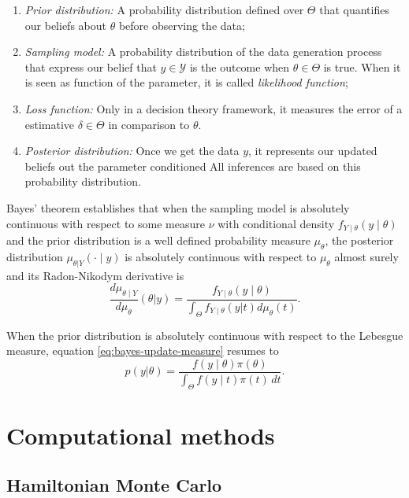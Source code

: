 \begin{enumerate}[label=(\alph*)]
    \item {\em Prior distribution:} A probability distribution defined over 
    $\Theta$ that quantifies our beliefs about $\theta$ before observing the data;
    \item {\em Sampling model: } A probability distribution of the data generation process
    that express our belief that $y \in \mathcal{Y}$ is the outcome when
    $\theta \in \Theta$ is true. When it is seen as function of the parameter,
    it is called {\em likelihood function};
    \item {\em Loss function:} Only in a decision theory framework, it
    measures the error of a estimative $\delta \in \Theta$ in comparison to
    $\theta$. 
    \item {\em Posterior distribution:} Once we get the data $y$, it
    represents our updated beliefs out the parameter conditioned All
    inferences are based on this probability distribution.
\end{enumerate} 

Bayes' theorem establishes that when the sampling model is absolutely
continuous with respect to some measure $\nu$ with conditional density
$f_{Y\mid \theta}(y\mid\theta)$ and the prior distribution is a
well defined probability measure $\mu_{\theta}$, the posterior distribution
$\mu_{\theta|Y}(\cdot\mid y)$ is
absolutely continuous with respect to $\mu_{\theta}$ almost surely and its
Radon-Nikodym derivative is \cite[p. 16]{schervish2012theory}
\begin{equation}
  \label{eq:bayes-update-measure}
  \frac{d\mu_{\theta\mid Y}}{d\mu_{\theta}}(\theta|y) = \frac{f_{Y\mid \theta}(y\mid \theta)}{\int_{\Theta} f_{Y\mid\theta}(y|t)d\mu_{\theta}(t)}.  
\end{equation}

When the prior distribution is absolutely continuous with respect to the
Lebesgue measure, equation \eqref{eq:bayes-update-measure} resumes to 
\begin{equation}
  p(y|\theta) = \frac{f(y\mid \theta)\pi(\theta)}{\int_{\Theta} f(y\mid t)\pi(t) \, dt}.  
\end{equation}

\section{Computational methods}
\label{sec:computational_methods}

\subsection{Hamiltonian Monte Carlo}
\label{sec:hamiltonian-monte-carlo}

